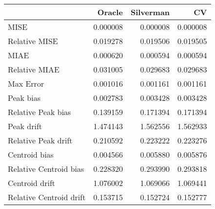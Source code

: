 \begin{tabular}{lrrr}
  \hline
 & Oracle & Silverman & CV \\ 
  \hline
MISE & 0.000008 & 0.000008 & 0.000008 \\ 
  Relative MISE & 0.019278 & 0.019506 & 0.019505 \\ 
  MIAE & 0.000620 & 0.000594 & 0.000594 \\ 
  Relative MIAE & 0.031005 & 0.029683 & 0.029683 \\ 
  Max Error & 0.001016 & 0.001161 & 0.001161 \\ 
  Peak bias & 0.002783 & 0.003428 & 0.003428 \\ 
  Relative Peak bias & 0.139159 & 0.171394 & 0.171394 \\ 
  Peak drift & 1.474143 & 1.562556 & 1.562933 \\ 
  Relative Peak drift & 0.210592 & 0.223222 & 0.223276 \\ 
  Centroid bias & 0.004566 & 0.005880 & 0.005876 \\ 
  Relative Centroid bias & 0.228320 & 0.293990 & 0.293818 \\ 
  Centroid drift & 1.076002 & 1.069066 & 1.069441 \\ 
  Relative Centroid drift & 0.153715 & 0.152724 & 0.152777 \\ 
   \hline
\end{tabular}
